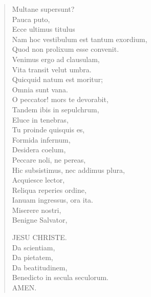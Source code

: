 \begin{verse}

  Multane supersunt?\\
  Pauca puto,\\
  Ecce ultimus titulus \\
  Nam hoc vestibulum est tantum exordium,\\
  Quod non prolixum esse convenit.\\
  Venimus ergo ad clausulam,\\
  Vita transit velut umbra.\\
  Quicquid natum est moritur;\\
  Omnia sunt vana.\\
  O peccator! mors te devorabit,\\
  Tandem ibis in sepulchrum,\\
  Eluce in tenebras,\\
  Tu proinde quisquis es,\\
  Formida infernum,\\
  Desidera coelum,\\
  Peccare noli, ne pereas,\\
  Hic subsistimus, nec addimus plura,\\
  Acquiesce lector,\\
  Reliqua reperies ordine,\\
  Ianuam ingressus, ora ita.\\
  Miserere nostri,\\
  Benigne Salvator,\\
  \begin{altverse}
    JESU CHRISTE.\\
    Da scientiam,\\
    Da pietatem,\\
    Da beatitudinem,\\
    Benedicto in secula seculorum.\\
    AMEN.\\
  \end{altverse}
\end{verse}
